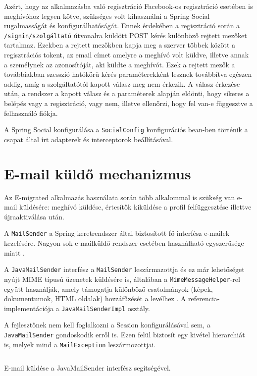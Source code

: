 \begin{reviewed}
Azért, hogy az alkalmazásba való regisztráció Facebook-os regisztráció esetében is meghívóhoz legyen kötve, szükséges volt kihasználni a Spring Social rugalmasságát és konfigurálhatóságát. Ennek érdekében a regisztráció során a
 \texttt{/signin/szolgáltató} útvonalra küldött POST kérés különböző rejtett mezőket tartalmaz. Ezekben a rejtett mezőkben kapja meg a szerver többek között a regisztrációs tokent, az email címet amelyre a meghívó volt küldve, illetve annak a személynek az azonosítóját, aki küldte a meghívót. Ezek a rejtett mezők a továbbiakban szesszió hatókörű kérés paraméterekként lesznek továbbítva egészen addig, amíg a szolgáltatótól kapott válasz meg nem érkezik. A válasz érkezése után, a rendszer a kapott válasz és a paraméterek alapján eldönti, hogy sikeres a belépés vagy a regisztráció, vagy nem, illetve ellenőrzi, hogy fel van-e függesztve a felhasználó fiókja. 

A Spring Social konfigurálása a \texttt{SocialConfig} konfigurációs bean-ben történik a csapat által írt adapterek és interceptorok beállításával. 

\section{E-mail küldő mechanizmus}
\label{subsec:e-mail}

Az E-migrated alkalmazás használata során több alkalommal is szükség van e-mail küldésére: meghívó küldése, értesítők kiküldése a profil felfüggesztése illettve újraaktiválása után.

A \texttt{MailSender} a Spring keretrendszer által biztosított fő interfész e-mailek kezelésére. Nagyon sok e-mailküldő rendszer esetében használható egyszerűsége miatt \cite{MailSender}. 

A \texttt{JavaMailSender} interfész a \texttt{MailSender} leszármazottja és ez már lehetőséget nyújt MIME típusú üzenetek küldésére is, általában a \texttt{MimeMessageHelper}-rel együtt használják, amely támogatja különböző csatolmányok (képek, dokumentumok, HTML oldalak) hozzáfűzését a levélhez \cite{JavaMail}. A referencia-implementációja a \texttt{JavaMailSenderImpl} osztály. 

A fejlesztőnek nem kell foglalkozni a Session konfigurálásával sem, a \texttt{JavaMailSender} gondoskodik erről is. Ezen felül biztosít egy kivétel hierarchiát is, melyek mind a \texttt{MailException} leszármozottjai. 

\begin{listing}
  \inputminted[fontsize=\small]{java}{progfiles/SendEmail.java}
  \caption{E-mail küldése a JavaMailSender interfész segítségével.}
  \label{lst:sendEmail}
\end{listing}


\end{reviewed}
